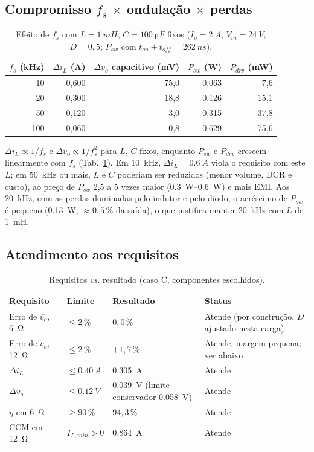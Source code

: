 \documentclass[11pt,a4paper]{article}
\newcommand{\fs}{f_s}
\newcommand{\Vin}{V_{in}}
\newcommand{\dIL}{\Delta i_L}
\newcommand{\dvo}{\Delta v_o}
\begin{document}
\subsection{Compromisso $\fs$ $\times$ ondula\c{c}\~ao $\times$ perdas}
\begin{table}[h]
\centering
\caption{Efeito de $\fs$ com $L=\SI{1}{mH}$, $C=\SI{100}{\micro F}$ fixos ($I_o=\SI{2}{A}$, $\Vin=\SI{24}{V}$, $D=0{,}5$; $P_{sw}$ com $t_{on}+t_{off}=\SI{262}{ns}$).}
\label{tab:fs}
\begin{tabular}{@{}rrrrr@{}}
\toprule
$\fs$ (kHz) & $\dIL$ (A) & $\dvo$ capacitivo (mV) & $P_{sw}$ (W) & $P_{drv}$ (mW) \\ \midrule
10  & 0,600 & 75,0 & 0,063 & 7,6 \\
20  & 0,300 & 18,8 & 0,126 & 15,1 \\
50  & 0,120 & 3,0  & 0,315 & 37,8 \\
100 & 0,060 & 0,8  & 0,629 & 75,6 \\ \bottomrule
\end{tabular}
\end{table}
$\dIL\propto1/\fs$ e $\dvo\propto1/\fs^2$ para $L$, $C$ fixos, enquanto $P_{sw}$ e $P_{drv}$ crescem linearmente com $\fs$ (Tab.~\ref{tab:fs}). Em \SI{10}{kHz}, $\dIL=\SI{0,6}{A}$ viola o requisito com este $L$; em \SI{50}{kHz} ou mais, $L$ e $C$ poderiam ser reduzidos (menor volume, DCR e custo), ao pre\c{c}o de $P_{sw}$ 2,5 a 5 vezes maior (\SIrange{0,3}{0,6}{W}) e mais EMI. Aos \SI{20}{kHz}, com as perdas dominadas pelo indutor e pelo diodo, o acr\'escimo de $P_{sw}$ \'e pequeno (\SI{0,13}{W}, $\approx0{,}5\,\%$ da sa\'ida), o que justifica manter \SI{20}{kHz} com $L$ de \SI{1}{mH}.

\subsection{Atendimento aos requisitos}\label{sec:concl}
\begin{table}[h]
\centering
\caption{Requisitos \emph{vs.} resultado (caso C, componentes escolhidos).}
\label{tab:atend}
\small
\begin{tabularx}{\linewidth}{@{}>{\raggedright\arraybackslash}p{3.3cm} l >{\raggedright\arraybackslash}p{3.4cm} X@{}}
\toprule
Requisito & Limite & Resultado & Status \\ \midrule
Erro de $\overline{v_o}$, \SI{6}{\ohm} & $\le2\,\%$ & $0{,}0\,\%$ & Atende (por constru\c{c}\~ao, $D$ ajustado nesta carga) \\
Erro de $\overline{v_o}$, \SI{12}{\ohm} & $\le2\,\%$ & $+1{,}7\,\%$ & Atende, margem pequena; ver abaixo \\
$\dIL$ & $\le\SI{0,40}{A}$ & \SI{0,305}{A} & Atende \\
$\dvo$ & $\le\SI{0,12}{V}$ & \SI{0,039}{V} (limite conservador \SI{0,058}{V}) & Atende \\
$\eta$ em \SI{6}{\ohm} & $\ge90\,\%$ & $94{,}3\,\%$ & Atende \\
CCM em \SI{12}{\ohm} & $I_{L,min}>0$ & \SI{0,864}{A} & Atende \\ \bottomrule
\end{tabularx}
\end{table}
\end{document}

